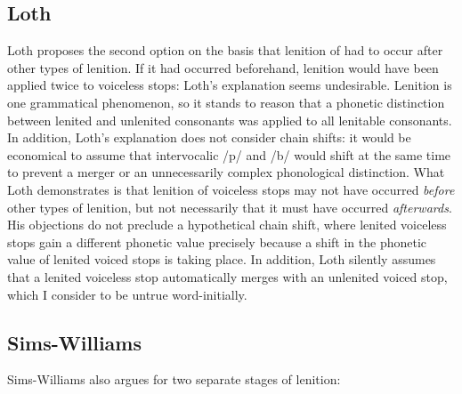\subsection{Loth}
Loth proposes the second option on the basis that lenition of  had to occur after other types of lenition. If it had occurred beforehand, lenition would have been applied twice to voiceless stops:  Loth's explanation seems undesirable. Lenition is one grammatical phenomenon, so it stands to reason that a phonetic distinction between lenited and unlenited consonants was applied to all lenitable consonants. In addition, Loth's explanation does not consider chain shifts: it would be economical to assume that intervocalic /p/ and /b/ would shift at the same time to prevent a merger or an unnecessarily complex phonological distinction. What Loth demonstrates is that lenition of voiceless stops may not have occurred \emph{before} other types of lenition, but not necessarily that it must have occurred \emph{afterwards}. His objections do not preclude a hypothetical chain shift, where lenited voiceless stops gain a different phonetic value precisely because a shift in the phonetic value of lenited voiced stops is taking place. In addition, Loth silently assumes that a lenited voiceless stop automatically merges with an unlenited voiced stop, which I consider to be untrue word-initially.

\subsection{Sims-Williams}
Sims-Williams also argues for two separate stages of lenition:

